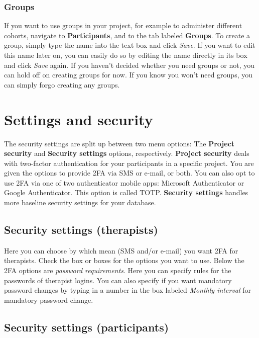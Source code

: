 \documentclass[]{book}
\begin{document}
\hypertarget{groups}{%
\subsection{Groups}\label{groups}}

If you want to use groups in your project, for example to administer different cohorts, navigate to \textbf{Participants}, and to the tab labeled \textbf{Groups}. To create a group, simply type the name into the text box and click \emph{Save}. If you want to edit this name later on, you can easily do so by editing the name directly in its box and click \emph{Save} again.
If you haven't decided whether you need groups or not, you can hold off on creating groups for now. If you know you won't need groups, you can simply forgo creating any groups.

\hypertarget{settings-and-security}{%
\chapter{Settings and security}\label{settings-and-security}}

The security settings are split up between two menu options: The \textbf{Project security} and \textbf{Security settings} options, respectively. \textbf{Project security} deals with two-factor authentication for your participants in a specific project. You are given the options to provide 2FA via SMS or e-mail, or both. You can also opt to use 2FA via one of two authenticator mobile apps: Microsoft Authenticator or Google Authenticator. This option is called TOTP.
\textbf{Security settings} handles more baseline security settings for your database.

\hypertarget{security-settings-therapists}{%
\section{Security settings (therapists)}\label{security-settings-therapists}}

Here you can choose by which mean (SMS and/or e-mail) you want 2FA for therapists. Check the box or boxes for the options you want to use.
Below the 2FA options are \emph{password requirements}. Here you can specify rules for the passwords of therapist logins. You can also specify if you want mandatory password changes by typing in a number in the box labeled \emph{Monthly interval} for mandatory password change.

\hypertarget{security-settings-participants}{%
\section{Security settings (participants)}\label{security-settings-participants}}
\end{document}
